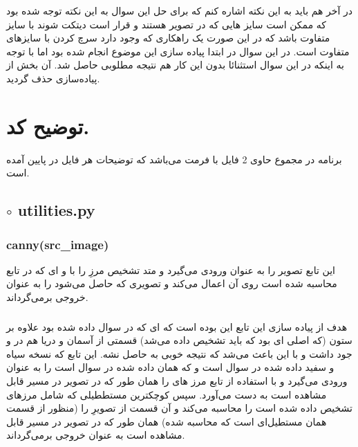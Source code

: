 \documentclass[a4paper,12pt]{article}
\begin{document}
  در آخر هم باید به این نکته اشاره کنم که برای حل این سوال به این نکته توجه شده بود که ممکن است سایز 
  هایی که در تصویر هستند و قرار است دیتکت شوند با سایز 
   متفاوت باشد که در این صورت یک راهکاری که وجود دارد سرچ کردن 
   با سایزهای متفاوت است. در این سوال در ابتدا پیاده سازی این موضوع انجام شده بود اما با توجه به اینکه در این سوال استثنائا بدون این کار هم نتیجه مطلوبی حاصل شد. آن بخش از پیاده‌سازی حذف گردید.
\section*{توضیح کد.}
برنامه در مجموع حاوی 2 فایل با فرمت
می‌باشد که توضیحات هر فایل در پایین آمده است.
\subsection*{$\circ$ utilities.py}
\subsubsection*{canny(src\_image)}
این تابع تصویر
را به عنوان ورودی می‌گیرد و متد تشخیص مرزِ
را با 
و
ای که در تابع محاسبه شده است روی آن اعمال می‌کند و تصویری که حاصل می‌شود را به عنوان خروجی بر‌می‌گرداند.
\subsubsection*{}
هدف از پیاده سازی این تابع این بوده است که 
ای که در سوال داده شده بود  علاوه بر ستون‌ (‌که 
اصلی ای بود که باید تشخیص داده می‌شد) قسمتی از آسمان و دریا هم در 
 و جود داشت و با این باعث می‌شد که نتیجه خوبی به حاصل نشه. این تابع 
 که نسخه سیاه و سفید 
 داده شده در سوال است و 
 که همان 
 داده شده در سوال است را به عنوان ورودی می‌گیرد و با استفاده از تابع 
 مرز های 
 را همان طور که در تصویر 
  در مسیر 
  قابل مشاهده است به دست می‌آورد. سپس کوچکترین مستططیلی که شامل مرزهای تشخیص داده شده است را محاسبه می‌کند و آن قسمت از تصویرِ
 را (منظور از قسمت همان مستطیل‌ای است که محاسبه شده) همان طور که در تصویر 
 در مسیر
 قابل مشاهده است به عنوان خروجی برمی‌گرداند.
\end{document}
